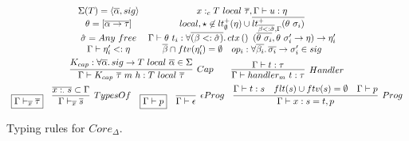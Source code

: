 \documentclass[11pt]{article}
\newcommand{\mathframebox}[1]{\framebox{$\displaystyle #1$}}
\newcommand{\ap}{~}
\newcommand{\ctx}[1]{ctx\left(#1\right)~}
\begin{document}
\begin{figure}
\begin{gather*}
{            }{
                \begin{array}{cc}
                    \Sigma(T) = \left< \overline{\alpha}, sig \right>
                    &
                    x :_c T\ap local\ap\overline{\tau}, \Gamma\vdash u : \eta
                    \\
                    \theta = [\overline{\alpha\to\tau}]
                    &
                    local, \star \not\in lt_\emptyset^+(\eta)\cup\overline{lt_{\overline{\beta <: \hat{\sigma}}, \Gamma}^+(\theta\ap\sigma_i)}
                    \\
                    \hat{\sigma} = Any\ap free
                    &
                    \Gamma\vdash\theta\ap t_i : \forall \overline{(\beta <: \hat{\sigma})}\ldotp \ctx{} (\overline{\theta\ap\sigma_i}, \theta\ap\sigma_i'\to\eta)\to\eta_i'
                    \\
                    \Gamma\vdash\eta_i' <: \eta
                    &
                    \begin{array}{cc}
                        \overline{\beta}\cap ftv(\eta_i') = \emptyset
                        &
                        op_i : \forall\overline{\beta_i}\ldotp \overline{\sigma_i}\to\sigma'_i \in sig
                    \end{array}
                \end{array}
            }\\
            \infer[Cap]{
                \Gamma\vdash K_{cap}\ap\overline{\tau}\ap m\ap h : T\ap local \ap\overline{\tau}
            }{
                K_{cap} : \forall\overline{\alpha}\ldotp sig\to T\ap local\ap\overline{\alpha} \in \Sigma
            }
            \hspace{2em}
            \infer[Handler]{
                \Gamma\vdash handler_m ~t : \tau
            }{
                \Gamma\vdash t : \tau
            }\\
            \begin{array}{ccccc}
                \mathframebox{\Gamma\vdash_{\overline{x}}\overline{\tau}} &
                \infer[TypesOf]{\Gamma\vdash_{\overline{x}}\overline{s}}{\overline{x :_\cdot s} \subset \Gamma} &
                \mathframebox{\Gamma\vdash p} &
                \infer[\epsilon Prog]{\Gamma\vdash\epsilon}{} &
                \infer[Prog]{
                    \Gamma\vdash x : s = t, p
                }{
                    \Gamma\vdash t : s &
                    flt(s)\cup ftv(s) = \emptyset &
                    \Gamma\vdash p
                }
            \end{array}
        \end{gather*}
        \caption{Typing rules for $Core_{\Delta}$.}
        \label{fig:core-delta-typing}
    \end{figure}
\end{document}
